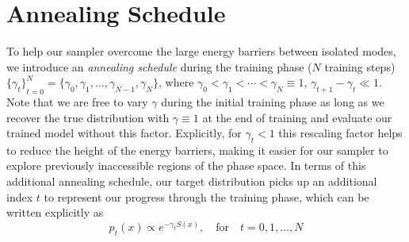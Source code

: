 \documentclass{article} %
\begin{document}
\section{\label{sec:annealing}Annealing Schedule}
%
To help our sampler overcome the large energy barriers between isolated modes, we introduce an \emph{annealing schedule}
during the training phase (\(N\) training steps) \({\{\gamma_{t}\}}_{t=0}^{N} = \{\gamma_{0}, \gamma_{1}, \ldots,
\gamma_{N-1}, \gamma_{N}\}\), where \(\gamma_{0} < \gamma_{1} < \cdots < \gamma_{N} \equiv 1\), \(\gamma_{t+1} -
\gamma_{t} \ll 1\).
%
Note that we are free to vary \(\gamma\) during the initial training phase as long as we recover the true distribution
with \(\gamma \equiv 1\) at the end of training and evaluate our trained model without this factor.
%
Explicitly, for \(\gamma_{t} < 1\) this rescaling factor helps to reduce the height of the energy barriers, making it
easier for our sampler to explore previously inaccessible regions of the phase space.
%
In terms of this additional annealing schedule, our target distribution picks up an additional index \(t\) to represent
our progress through the training phase, which can be written explicitly as %
\begin{equation}
   p_{t}(x)\propto e^{-\gamma_{t} S(x)},\quad\text{for}\quad t=0, 1, \ldots, N
   \label{eq:targetannealing}
\end{equation}
%
\end{document}
